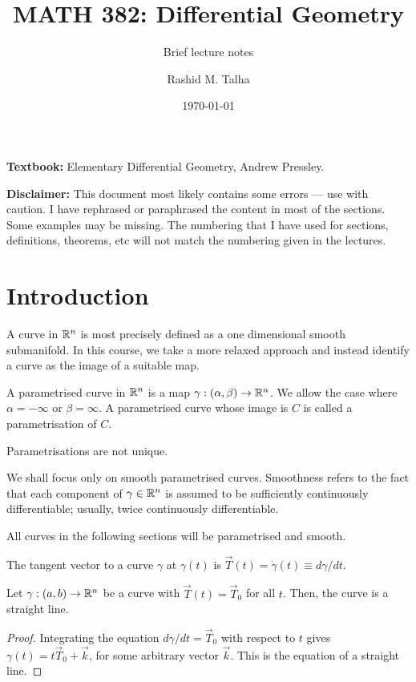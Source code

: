 \documentclass[11pt]{penrose}
\title{MATH 382: Differential Geometry}
\subtitle{Brief lecture notes}
\author{Rashid M. Talha}
\affiliation{School of Natural Sciences, NUST}
\date{\today}
\newcommand{\vT}{\vec{T}}
\newcommand{\keyword}[1]{\textsf{#1}}
\begin{document}
\maketitle

\textbf{Textbook:} Elementary Differential Geometry, Andrew Pressley.

\textbf{Disclaimer:} This document most likely contains some errors --- use with caution. I have rephrased or paraphrased the content in most of the sections. Some examples may be missing. The numbering that I have used for sections, definitions, theorems, etc will not match the numbering given in the lectures.

\section{Introduction}
A \keyword{curve} in $\mathbb{R}^n$ is most precisely defined as a one dimensional smooth submanifold. In this course, we take a more relaxed approach and instead identify a curve as the image of a suitable map.

\begin{ndfn}
    A \keyword{parametrised curve} in $\mathbb{R}^n$ is a map $\gamma : (\alpha, \beta) \to \mathbb{R}^n$. We allow the case where $\alpha = -\infty$ or $\beta = \infty$. A parametrised curve whose image is $C$ is called a \keyword{parametrisation} of $C$.
\end{ndfn}

Parametrisations are not unique.

We shall focus only on smooth parametrised curves. Smoothness refers to the fact that each component of $\gamma \in \mathbb{R}^n$ is assumed to be sufficiently continuously differentiable; usually, twice continuously differentiable.

All curves in the following sections will be parametrised and smooth.

\begin{ndfn}
    The \keyword{tangent vector} to a curve $\gamma$ at $\gamma(t)$ is $\vT(t) = \dot{\gamma}(t) \equiv d\gamma/dt$.
\end{ndfn}

\begin{nprop}
    Let $\gamma : (a, b) \to \mathbb{R}^n$ be a curve with $\vT(t) = \vT_0$ for all $t$. Then, the curve is a straight line.
\end{nprop}
\begin{proof}
    Integrating the equation $d\gamma/dt = \vT_0$ with respect to $t$ gives $\gamma(t) = t \vT_0 + \vec{k}$, for some arbitrary vector $\vec{k}$. This is the equation of a straight line.
\end{proof}
\end{document}
